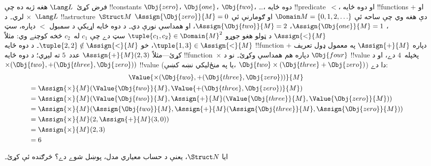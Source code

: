 \documentclass[../../../include/open-logic-section]{subfiles}
\begin{document}
\begin{ex}
فرض کړئ~$\Lang L$ هغه ژبه ده چې !!{constant}s $\Obj{zero}$،
$\Obj{one}$، $\Obj{two}$، \dots، دوه ځايه !!{predicate}~$<$، او
دوه ځايه !!{function}s $+$ او $\times$ لري۔ د~$\Lang L$
!!a{structure}~$\Struct M$ دې هغه وي چې ساحه ئې
$\Domain M = \{0, 1, 2, \ldots \}$ او ګومارنې ئې
$\Assign{\Obj{zero}}{M} = 0$، $\Assign{\Obj{one}}{M} = 1$،
$\Assign{\Obj{two}}{M} = 2$، او همداسې نورې دي۔ د دوه ځايه اړيکې د
سمبول $<$ دپاره، سټ $\Assign{<}{M}$ د ټولو هغو جوړو
$\tuple{c_1, c_2} \in \Domain{M}^2$ سټ دے چې $c_1$ له~$c_2$ څخه
کوچنے وي: مثلاً $\tuple{1, 3} \in \Assign{<}{M}$، خو
$\tuple{2, 2} \notin \Assign{<}{M}$۔ د دوه ځايه !!{function} $+$
دپاره $\Assign{+}{M}$ په معمول ډول تعريف کړئ---مثلاً
$\Assign{+}{M}(2,3)$ عدد~$5$ ته لېږي؛ د دوه ځايه
!!{function}~$\times$ دپاره هم همداسې وکړئ۔ نو د $\Obj{four}$
!!{value} پخپله~$4$ دے، او د $\times(\Obj{two},
+(\Obj{three},\Obj{zero}))$ !!{value} (يا په منځ‌ليکي نښه کښې،
$\Obj{two} \times (\Obj{three} + \Obj{zero})$) دا دے:
\begin{multline*}
\Value{\times(\Obj{two}, +(\Obj{three},\Obj{zero}))}{M} \\
\begin{aligned}
& =\Assign{\times}{M}(\Value{\Obj{two}}{M}, \Value{+(\Obj{three}, \Obj{zero})}{M})\\
& = \Assign{\times}{M}(\Value{\Obj{two}}{M}, \Assign{+}{M}(\Value{\Obj{three}}{M},
\Value{\Obj{zero}}{M})) \\
& = \Assign{\times}{M}(\Assign{\Obj{two}}{M}, \Assign{+}{M}(\Assign{\Obj{three}}{M},
\Assign{\Obj{zero}}{M})) \\
& = \Assign{\times}{M}(2, \Assign{+}{M}(3, 0)) \\
& = \Assign{\times}{M}(2, 3) \\
& = 6
\end{aligned}
\end{multline*}
\end{ex}

\begin{prob}
ايا $\Struct N$، يعنې د حساب معياري مدل، پوښل شوے دے؟ څرګنده ئې کړئ۔
\end{prob}
\end{document}
